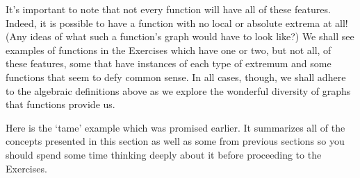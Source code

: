 
\medskip

It's important to note that not every function will have all of these features.  Indeed, it is possible to have a function with no local or absolute extrema at all!  (Any ideas of what such a function's graph would have to look like?)  We shall see examples of functions in the Exercises which have one or two, but not all, of these features, some that have instances of each type of extremum and some functions that seem to defy common sense.  In all cases, though, we shall adhere to the algebraic definitions above as we explore the wonderful diversity of graphs that functions provide us.

\medskip

Here is the `tame' example which was promised earlier.  It summarizes all of the concepts presented in this section as well as some from previous sections so you should spend some time thinking deeply about it before proceeding to the Exercises.


